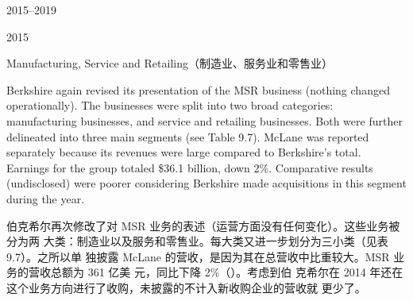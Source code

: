 \begin{chapter}{2015--2019}
\begin{section}{2015}
\begin{subsection}{Manufacturing, Service and Retailing（制造业、服务业和零售业）}

\begin{verseparallel}
  {

    Berkshire again revised its presentation of the MSR business (nothing
    changed operationally). The businesses were split into two broad categories:
    manufacturing businesses, and service and retailing businesses. Both were
    further delineated into three main segments (see Table 9.7). McLane was
    reported separately because its revenues were large compared to Berkshire's
    total. Earnings for the group totaled \$36.1 billion, down 2\%. Comparative
    results (undisclosed) were poorer considering Berkshire made acquisitions in
    this segment during the year. \\
  }
  {
    伯克希尔再次修改了对 MSR 业务的表述（运营方面没有任何变化）。这些业务被分为两
    大类：制造业以及服务和零售业。每大类又进一步划分为三小类（见表9.7）。之所以单
    独披露 McLane 的营收，是因为其在总营收中比重较大。MSR 业务的营收总额为 361 亿美
    元，同比下降 2\%（{\color{red}{这里原文有误，应为营收}}）。考虑到伯
    克希尔在 2014 年还在这个业务方向进行了收购，未披露的不计入新收购企业的营收就
    更少了。
  }
\end{verseparallel}


\end{subsection}
\end{section}
\end{chapter}

